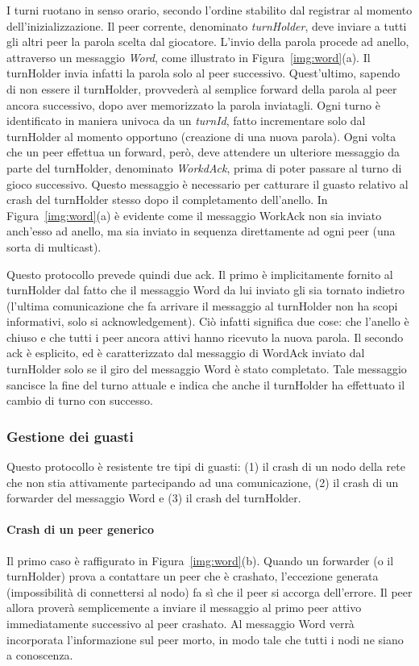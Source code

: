 \documentclass[10.5pt]{article}
\begin{document}
I turni ruotano in senso orario, secondo l'ordine stabilito dal registrar al momento dell'inizializzazione. Il peer corrente, denominato \emph{turnHolder}, deve inviare a tutti gli altri peer la parola scelta dal giocatore. L'invio della parola procede ad anello, attraverso un messaggio \emph{Word}, come illustrato in Figura~\ref{img:word}(a). Il turnHolder invia infatti la parola solo al peer successivo. Quest'ultimo, sapendo di non essere il turnHolder, provvederà al semplice forward della parola al peer ancora successivo, dopo aver memorizzato la parola inviatagli. Ogni turno è identificato in maniera univoca da un \emph{turnId}, fatto incrementare solo dal turnHolder al momento opportuno (creazione di una nuova parola). Ogni volta che un peer effettua un forward, però, deve attendere un ulteriore messaggio da parte del turnHolder, denominato \emph{WorkdAck}, prima di poter passare al turno di gioco successivo. Questo messaggio è necessario per catturare il guasto relativo al crash del turnHolder stesso dopo il completamento dell'anello. In Figura~\ref{img:word}(a) è evidente come il messaggio WorkAck non sia inviato anch'esso ad anello, ma sia inviato in sequenza direttamente ad ogni peer (una sorta di multicast).

Questo protocollo prevede quindi due ack. Il primo è implicitamente fornito al turnHolder dal fatto che il messaggio Word da lui inviato gli sia tornato indietro (l'ultima comunicazione che fa arrivare il messaggio al turnHolder non ha scopi informativi, solo si acknowledgement). Ciò infatti significa due cose: che l'anello è chiuso e che tutti i peer ancora attivi hanno ricevuto la nuova parola. Il secondo ack è esplicito, ed è caratterizzato dal messaggio di WordAck inviato dal turnHolder solo se il giro del messaggio Word è stato completato. Tale messaggio sancisce la fine del turno attuale e indica che anche il turnHolder ha effettuato il cambio di turno con successo.

\subsubsection{Gestione dei guasti}
Questo protocollo è resistente tre tipi di guasti: (1) il crash di un nodo della rete che non stia attivamente partecipando ad una comunicazione, (2) il crash di un forwarder del messaggio Word e (3) il crash del turnHolder.

\paragraph{Crash di un peer generico}
Il primo caso è raffigurato in Figura~\ref{img:word}(b). Quando un forwarder (o il turnHolder) prova a contattare un peer che è crashato, l'eccezione generata (impossibilità di connettersi al nodo) fa sì che il peer si accorga dell'errore. Il peer allora proverà semplicemente a inviare il messaggio al primo peer attivo immediatamente successivo al peer crashato. Al messaggio Word verrà incorporata l'informazione sul peer morto, in modo tale che tutti i nodi ne siano a conoscenza.
\end{document}
